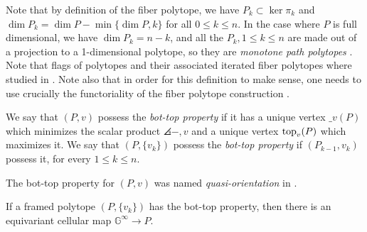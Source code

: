 Note that by definition of the fiber polytope, we have $P_k \subset \ker \pi_k$ and $\dim P_k = \dim P - \min\{ \dim P,k\}$ for all $0\leq k \leq n$.
In the case where $P$ is full dimensional, we have $\dim P_k = n-k$, and all the $P_k, 1 \leq k \leq n$ are made out of a projection to a 1-dimensional polytope, so they are \emph{monotone path polytopes} \cite[Theorem 5.3]{BilleraSturmfels92}.
Note that flags of polytopes and their associated iterated fiber polytopes where studied in \cite{BilleraSturmfels94}.
Note also that in order for this definition to make sense, one needs to use crucially the functoriality of the fiber polytope construction \cite[Lemma 2.3]{BilleraSturmfels92}.

\begin{definition}
	We say that $(P,v)$ possess the \emph{bot-top property} if it has a unique vertex $\bm_v(P)$ which minimizes the scalar product $\angles{-,v}$ and a unique vertex $\operatorname{top}_v(P)$ which maximizes it.
	We say that $(P,\{v_k\})$ possess the \emph{bot-top property} if $(P_{k-1}, v_k)$ possess it, for every $1\leq k \leq n$.
\end{definition}

The bot-top property for $(P,v)$ was named \emph{quasi-orientation} in \cite[Definition 1.11]{GLA21}.

\begin{theorem}
	\label{thm:map-from-the-globe}
	If a framed polytope $(P,\{v_k\})$ has the bot-top property, then there is an equivariant cellular map $\mathbb{G}^\infty \to P$.
\end{theorem}

